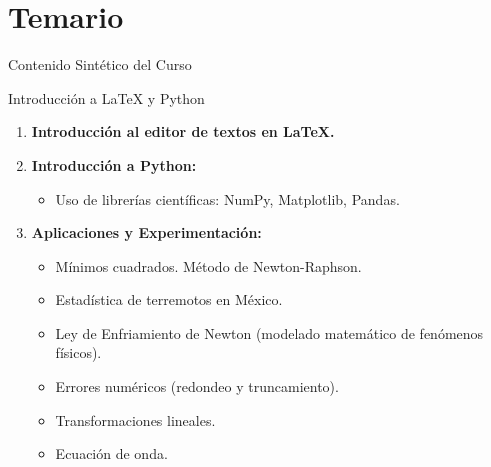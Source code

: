 \documentclass[aspectratio=169, 10pt]{beamer}
\begin{document}
\section{Temario}
\begin{frame}{Contenido Sintético del Curso}
\begin{block}{Introducción a \LaTeX{} y Python}
    \begin{enumerate}
        \item \textbf{Introducción al editor de textos en \LaTeX{}.} \pause
        \item \textbf{Introducción a Python:}
        \begin{itemize}
            \item Uso de librerías científicas: NumPy, Matplotlib, Pandas.
        \end{itemize} \pause
        \item \textbf{Aplicaciones y Experimentación:}
        \begin{itemize}
            \item Mínimos cuadrados. Método de Newton-Raphson. 
            \item Estadística de terremotos en México.
            \item Ley de Enfriamiento de Newton (modelado matemático de fenómenos físicos).
            \item Errores numéricos (redondeo y truncamiento).
            \item Transformaciones lineales.
            \item Ecuación de onda.
        \end{itemize}
    \end{enumerate}
\end{block}
\end{frame}

\end{document}
